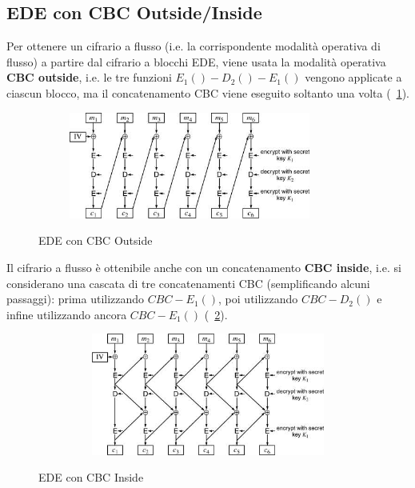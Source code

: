 \subsection{EDE con CBC Outside/Inside}
Per ottenere un cifrario a flusso (i.e. la corrispondente modalità operativa di flusso) a partire dal cifrario a blocchi EDE, viene usata la modalità operativa \textbf{CBC outside}, i.e. le tre funzioni $E_{1}()-D_{2}()-E_{1}()$ vengono applicate a ciascun blocco, ma il concatenamento CBC viene eseguito soltanto una volta (\figurename~\ref{fig:EDE_CBC_Out}).\\ 
\begin{figure}[htbp]
	\centering%
	\subfigure%
	{\includegraphics[height=3.5cm, width=10cm, keepaspectratio]{Immagini/modalita_operative/EDE_CBC_Out.png}}
	\caption{EDE con CBC Outside \label{fig:EDE_CBC_Out}} 	
\end{figure}
Il cifrario a flusso è ottenibile anche con un concatenamento \textbf{CBC inside}, i.e. si considerano una cascata di tre concatenamenti CBC (semplificando alcuni passaggi): prima utilizzando $CBC-E_{1}()$, poi utilizzando $CBC-D_{2}()$ e infine utilizzando ancora $CBC-E_{1}()$ (\figurename ~\ref{fig:EDE_CBC_In}).
\begin{figure}[htbp]
	\centering%
	\subfigure%
	{\includegraphics[height=4cm, width=12cm, keepaspectratio]{Immagini/modalita_operative/EDE_CBC_In.png}}
	\caption{EDE con CBC Inside \label{fig:EDE_CBC_In}} 	
\end{figure}
